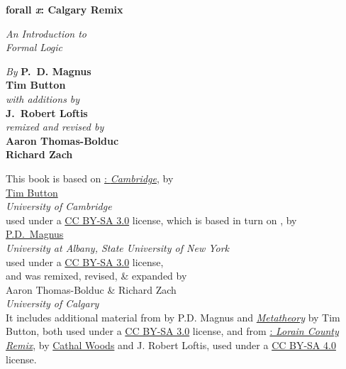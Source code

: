 

\pagestyle{empty}

\vspace*{80pt}

\begin{raggedleft}
\fontsize{24pt}{24pt}\selectfont
  \textbf{forall \textit{x}: Calgary Remix}

\medskip\fontsize{18pt}{20pt}\selectfont

\textit{An Introduction to\\ Formal Logic}

\vspace*{50pt}
\fontsize{16pt}{18pt}\selectfont \textit{By } \textbf{P.~D. Magnus}\\
\textbf{Tim Button}\\
\textit{with additions by}\\
\textbf{J.~Robert Loftis}\\
\textit{remixed and revised by}\\
\textbf{Aaron Thomas-Bolduc}\\ \textbf{Richard Zach}

\vfill
\forallxversion\par
\end{raggedleft}


\newpage


\noindent \small This book is based on \href{http://people.ds.cam.ac.uk/tecb2/forallx.shtml}{\forallx:\emph{ Cambridge}}, by\\[2ex]
\href{http://people.ds.cam.ac.uk/tecb2/index.shtml}{Tim Button}\\
\emph{University of Cambridge}\\[2ex]
used under a \href{https://creativecommons.org/licenses/by-sa/3.0/}{CC BY-SA 3.0} license, which is based in turn on \href{https://www.fecundity.com/logic/}{\forallx}, by\\[2ex]
\href{https://www.fecundity.com/job/}{P.D.\ Magnus}\\
\emph{University at Albany, State University of New York}\\[2ex]
used under a \href{https://creativecommons.org/licenses/by-sa/3.0/}{CC BY-SA 3.0} license,
\\
and was remixed, revised, \& expanded by\\[2ex] {Aaron Thomas-Bolduc \& Richard Zach}\\
\emph{University of Calgary}
\\[4ex]
It includes additional material from \forallx{} by P.D. Magnus
and \href{http://people.ds.cam.ac.uk/tecb2/metatheory.shtml}{\emph{Metatheory}} by Tim Button, both used under
a \href{https://creativecommons.org/licenses/by-sa/3.0/}{CC BY-SA 3.0}
license, and from \href{https://github.com/rob-helpy-chalk/openintroduction}{\forallx: \emph{Lorain County Remix}}, by \href{https://sites.google.com/site/cathalwoods/}{Cathal
Woods} and J. Robert Loftis, used under
a \href{https://creativecommons.org/licenses/by-sa/4.0/}{CC BY-SA 4.0}
license.

